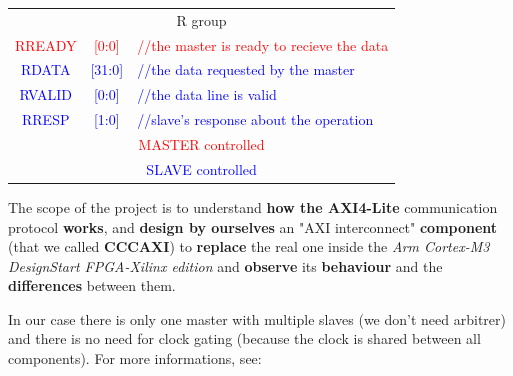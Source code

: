 \begin{tabular} {c c l}
  \multicolumn{3}{c}{{R group}} \\
  \textcolor{Red}{\small{RREADY}} & \textcolor{Red}{\small{[0:0]}} & \textcolor{Red}{\small{//the master is ready to recieve the data}} \\
  \textcolor{Blue}{\small{RDATA}} & \textcolor{Blue}{\small{[31:0]}} & \textcolor{Blue}{\small{//the data requested by the master}} \\
  \textcolor{Blue}{\small{RVALID}} & \textcolor{Blue}{\small{[0:0]}} & \textcolor{Blue}{\small{//the data line is valid}} \\
  \textcolor{Blue}{\small{RRESP}} & \textcolor{Blue}{\small{[1:0]}} & \textcolor{Blue}{\small{//slave’s response about the operation}} \\

  \hline
  \multicolumn{3}{c}{\textcolor{Red}{MASTER controlled}} \\
  \multicolumn{3}{c}{\textcolor{Blue}{SLAVE controlled}} \\
\end{tabular}

\newpage
{}

The scope of the project is to understand {\bf how the AXI4-Lite} communication protocol {\bf works}, and {\bf design by ourselves} an "AXI interconnect" {\bf component} (that we called {\bf CCCAXI}) to {\bf replace} the real one inside the {\it Arm Cortex-M3 DesignStart FPGA-Xilinx edition} and {\bf observe} its {\bf behaviour} and the {\bf differences} between them.

In our case there is only one master with multiple slaves (we don't need arbitrer) and there is no need for clock gating (because the clock is shared between all components).
For more informations, see: \cite{vivadoGuide} \cite{AXISpecification}
\newline
